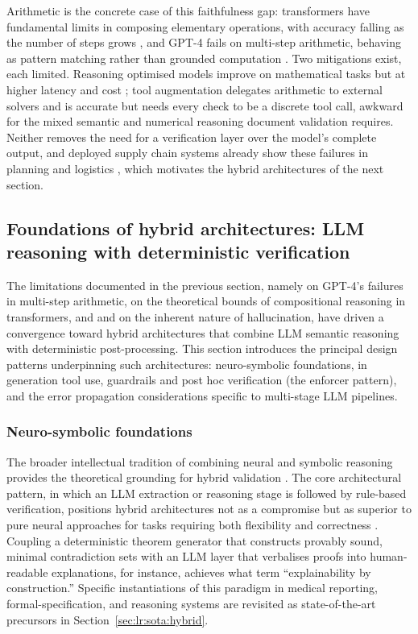 Arithmetic is the concrete case of this faithfulness gap: transformers have fundamental limits in composing elementary operations, with accuracy falling as the number of steps grows \citep{dziri2024}, and GPT-4 fails on multi-step arithmetic, behaving as pattern matching rather than grounded computation \citep{arkoudas2023}. Two mitigations exist, each limited. Reasoning optimised models improve on mathematical tasks but at higher latency and cost \citep{li2025reasoning}; tool augmentation delegates arithmetic to external solvers and is accurate \citep{lyu2023,schick2024} but needs every check to be a discrete tool call, awkward for the mixed semantic and numerical reasoning document validation requires. Neither removes the need for a verification layer over the model's complete output, and deployed supply chain systems already show these failures in planning and logistics \citep{bahroun2026}, which motivates the hybrid architectures of the next section.


\subsection{Foundations of hybrid architectures: LLM reasoning with deterministic verification}
\label{sec:lr:hybrid}

The limitations documented in the previous section, namely \citet{arkoudas2023} on GPT-4's failures in multi-step arithmetic, \citet{dziri2024} on the theoretical bounds of compositional reasoning in transformers, and \citet{ji2023} and \citet{huang2024hallucination} on the inherent nature of hallucination, have driven a convergence toward hybrid architectures that combine LLM semantic reasoning with deterministic post-processing. This section introduces the principal design patterns underpinning such architectures: neuro-symbolic foundations, in generation tool use, guardrails and post hoc verification (the enforcer pattern), and the error propagation considerations specific to multi-stage LLM pipelines.

\subsubsection{Neuro-symbolic foundations}

The broader intellectual tradition of combining neural and symbolic reasoning provides the theoretical grounding for hybrid validation \citep{gorenshtein2026neurosymbolic, yang2025neurosymbolic}. The core architectural pattern, in which an LLM extraction or reasoning stage is followed by rule-based verification, positions hybrid architectures not as a compromise but as superior to pure neural approaches for tasks requiring both flexibility and correctness \citep{prenosil2025, xu2025, bayless2025}. Coupling a deterministic theorem generator that constructs provably sound, minimal contradiction sets with an LLM layer that verbalises proofs into human-readable explanations, for instance, achieves what \citet{xu2025} term ``explainability by construction.'' Specific instantiations of this paradigm in medical reporting, formal-specification, and reasoning systems are revisited as state-of-the-art precursors in Section~\ref{sec:lr:sota:hybrid}.

